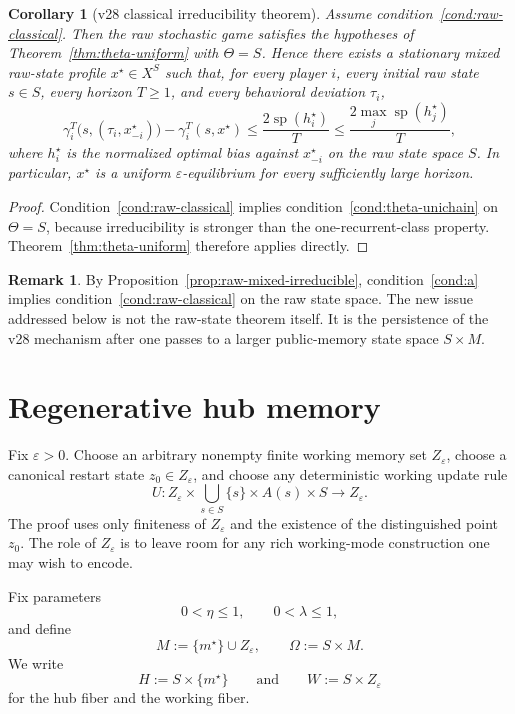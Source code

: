 \documentclass[11pt]{article}
\newtheorem{corollary}[theorem]{Corollary}
\theoremstyle{definition}
\newtheorem{remark}[theorem]{Remark}
\newcommand{\1}{\mathbf{1}}
\DeclareMathOperator{\spn}{sp}
\begin{document}
\begin{corollary}[v28 classical irreducibility theorem]\label{cor:v28}
Assume condition~\ref{cond:raw-classical}. Then the raw stochastic game satisfies the hypotheses of Theorem~\ref{thm:theta-uniform} with $\Theta=S$. Hence there exists a stationary mixed raw-state profile $x^\star\in X^S$ such that, for every player $i$, every initial raw state $s\in S$, every horizon $T\ge1$, and every behavioral deviation $\tau_i$,
\[
\gamma_i^T\bigl(s,(\tau_i,x_{-i}^\star)\bigr)-\gamma_i^T(s,x^\star)
\le \frac{2\spn(h_i^\star)}{T}
\le \frac{2\max_j\spn(h_j^\star)}{T},
\]
where $h_i^\star$ is the normalized optimal bias against $x_{-i}^\star$ on the raw state space $S$. In particular, $x^\star$ is a uniform $\varepsilon$-equilibrium for every sufficiently large horizon.
\end{corollary}

\begin{proof}
Condition~\ref{cond:raw-classical} implies condition~\ref{cond:theta-unichain} on $\Theta=S$, because irreducibility is stronger than the one-recurrent-class property. Theorem~\ref{thm:theta-uniform} therefore applies directly.
\end{proof}

\begin{remark}
By Proposition~\ref{prop:raw-mixed-irreducible}, condition~\ref{cond:a} implies condition~\ref{cond:raw-classical} on the raw state space. The new issue addressed below is not the raw-state theorem itself. It is the persistence of the v28 mechanism after one passes to a larger public-memory state space $S\times M$.
\end{remark}

\section{Regenerative hub memory}\label{sec:hub-memory}

Fix $\varepsilon>0$. Choose an arbitrary nonempty finite working memory set $Z_\varepsilon$, choose a canonical restart state $z_0\in Z_\varepsilon$, and choose any deterministic working update rule
\[
U:Z_\varepsilon\times\bigcup_{s\in S}\{s\}\times A(s)\times S\longrightarrow Z_\varepsilon.
\]
The proof uses only finiteness of $Z_\varepsilon$ and the existence of the distinguished point $z_0$. The role of $Z_\varepsilon$ is to leave room for any rich working-mode construction one may wish to encode.

Fix parameters
\[
0<\eta\le1,
\qquad
0<\lambda\le1,
\]
and define
\[
M:=\{m^\star\}\cup Z_\varepsilon,
\qquad
\Omega:=S\times M.
\]
We write
\[
H:=S\times\{m^\star\}
\qquad\text{and}\qquad
W:=S\times Z_\varepsilon
\]
for the hub fiber and the working fiber.
\end{document}
